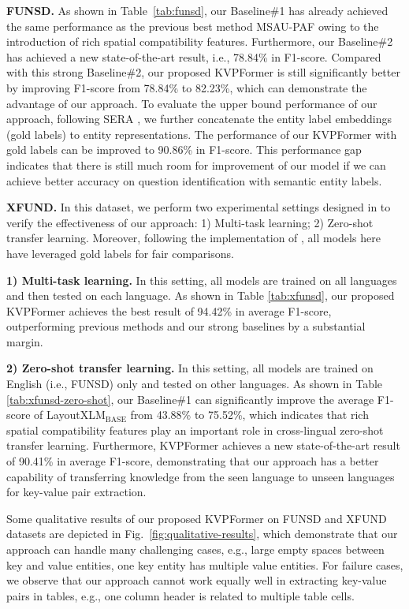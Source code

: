 \documentclass[letterpaper]{article}
\def \Ours {KVPFormer}
\begin{document}
\textbf{FUNSD.}
As shown in Table~\ref{tab:funsd}, our Baseline\#1 has already achieved the same performance as the previous best method MSAU-PAF owing to the introduction of rich spatial compatibility features. Furthermore, our Baseline\#2 has achieved a new state-of-the-art result, i.e., 78.84\% in F1-score. Compared with this strong Baseline\#2, our proposed \Ours{} is still significantly better by improving F1-score from 78.84\% to 82.23\%, which can demonstrate the advantage of our approach. To evaluate the upper bound performance of our approach, following SERA \cite{zhang2021entity}, we further concatenate the entity label embeddings (gold labels) to entity representations. The performance of our \Ours{} with gold labels can be improved to 90.86\% in F1-score. This performance gap indicates that there is still much room for improvement of our model if we can achieve better accuracy on question identification with semantic entity labels.

\textbf{XFUND.} In this dataset, we perform two experimental settings designed in \cite{xu2021layoutxlm} to verify the effectiveness of our approach: 1) Multi-task learning; 2) Zero-shot transfer learning. Moreover, following the implementation of \cite{xu2021layoutxlm}, all models here have leveraged gold labels for fair comparisons.

\textbf{1) Multi-task learning.} In this setting, all models are trained on all languages and then tested on each language. As shown in Table \ref{tab:xfunsd}, our proposed \Ours{} achieves the best result of 94.42\% in average F1-score, outperforming previous methods and our strong baselines by a substantial margin.

\textbf{2) Zero-shot transfer learning.} In this setting, all models are trained on English (i.e., FUNSD) only and tested on other languages. As shown in Table \ref{tab:xfunsd-zero-shot}, our Baseline\#1 can significantly improve the average F1-score of LayoutXLM$_{\mathrm{BASE}}$ from 43.88\% to 75.52\%, which indicates that rich spatial compatibility features play an important role in cross-lingual zero-shot transfer learning. Furthermore, \Ours{} achieves a new state-of-the-art result of 90.41\% in average F1-score, demonstrating that our approach has a better capability of transferring knowledge from the seen language to unseen languages for key-value pair extraction.


Some qualitative results of our proposed KVPFormer on FUNSD and XFUND datasets are depicted in Fig.~\ref{fig:qualitative-results}, which demonstrate that our approach can handle many challenging cases, e.g., large empty spaces between key and value entities, one key entity has multiple value entities. For failure cases, we observe that our approach cannot work equally well in extracting key-value pairs in tables, e.g., one column header is related to multiple table cells.
\end{document}
